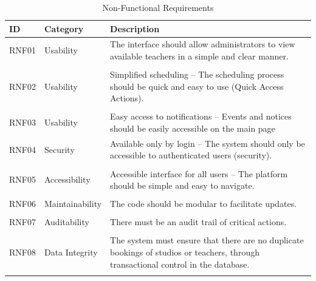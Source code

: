 \documentclass[12pt,a4paper]{report}
\begin{document}
\begin{table}[H]
\centering
\caption{Non-Functional Requirements}
\begin{tabularx}{\textwidth}{@{} l l X @{}}
\toprule
\textbf{ID} & \textbf{Category} & \textbf{Description} \\
\midrule
RNF01 & Usability & The interface should allow administrators to view available teachers in a simple and clear manner. 
\\
\\
RNF02 & Usability & Simplified scheduling – The scheduling process should be quick and easy to use (Quick Access Actions).
\\
\\
RNF03 & Usability &  Easy access to notifications – Events and notices should be easily accessible on the main page 
\\
RNF04 & Security & Available only by login – The system should only be accessible to authenticated users (security). 
\\
\\
RNF05 & Accessibility & Accessible interface for all users – The platform should be simple and easy to navigate.
\\
\\
RNF06 &  Maintainability  & The code should be modular to facilitate updates. 
\\
\\

RNF07 & Auditability & There must be an audit trail of critical actions. 
\\
\\
RNF08 & Data Integrity & The system must ensure that there are no duplicate bookings of studios or teachers, through transactional control in the database.
\\
\\
\bottomrule
\end{tabularx}
\end{table}
\end{document}

